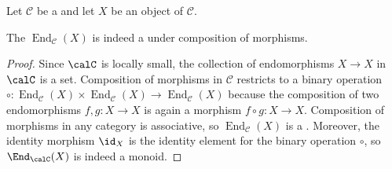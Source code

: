 \begin{proposition} \label{proposition:endomorphism_semigroup_of_an_object_in_a_locally_small_category_is_indeed_a_semigroup}
    Let $\mathcal{C}$ be a  and let $X$ be an object of $\mathcal{C}$.

    The  $\operatorname{End}_{\mathcal{C}}(X)$ is indeed a  under composition of morphisms.
\end{proposition}
\begin{proof}
    Since $\calC$ is locally small, the collection of endomorphisms $X \to X$ in $\calC$ is a set. Composition of morphisms in $\mathcal{C}$ restricts to a binary operation $\circ: \operatorname{End}_{\mathcal{C}}(X) \times \operatorname{End}_{\mathcal{C}}(X) \to \operatorname{End}_{\mathcal{C}}(X)$ because the composition of two endomorphisms $f,g: X \to X$ is again a morphism $f \circ g: X \to X$. Composition of morphisms in any category is associative, so $\operatorname{End}_{\mathcal{C}}(X)$ is a . Moreover, the identity morphism $\id_X$ is the identity element for the binary operation $\circ$, so $\End_\calC(X)$ is indeed a monoid.
\end{proof}